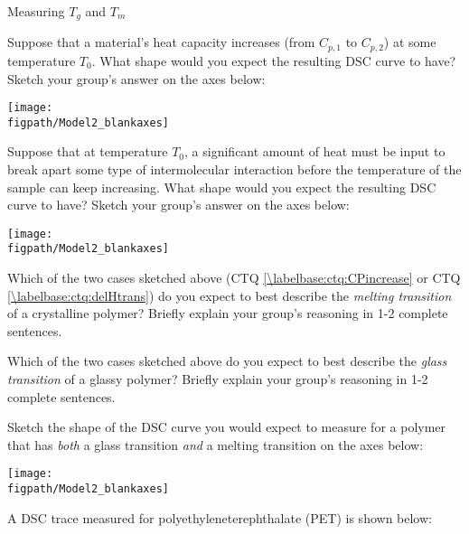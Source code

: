 \begin{activity}{Measuring $T_g$ and $T_m$}
\begin{ctqs}
			\begin{solution}[1.25in]
			\end{solution}
		
	\question Suppose that a material's heat capacity increases (from $C_{p,1}$ to $C_{p,2}$) at some temperature $T_0$.  What shape would you expect the resulting DSC curve to have?  Sketch your group's answer on the axes below: \label{\labelbase:ctq:CPincrease}
	
		\vspace{6pt}
		\centerline{\texttt{[image: \\figpath/Model2\_blankaxes]}}
		
	\question Suppose that at temperature $T_0$, a significant amount of heat must be input to break apart some type of intermolecular interaction before the temperature of the sample can keep increasing.  What shape would you expect the resulting DSC curve to have?  Sketch your group's answer on the axes below:\label{\labelbase:ctq:delHtrans}
	
		\vspace{6pt}
		\centerline{\texttt{[image: \\figpath/Model2\_blankaxes]}}
		
	\question Which of the two cases sketched above (CTQ \ref{\labelbase:ctq:CPincrease} or CTQ \ref{\labelbase:ctq:delHtrans}) do you expect to best describe the \emph{melting transition} of a crystalline polymer?  Briefly explain your group's reasoning in 1-2 complete sentences.
	
		\begin{solution}[2in]
		\end{solution}
	
	\question Which of the two cases sketched above do you expect to best describe the \emph{glass transition} of a glassy polymer?  Briefly explain your group's reasoning in 1-2 complete sentences.
	
		\begin{solution}[2in]
		\end{solution}
	
	\question Sketch the shape of the DSC curve you would expect to measure for a polymer that has \emph{both} a glass transition \emph{and} a melting transition on the axes below:
	
		\vspace{6pt}
		\centerline{\texttt{[image: \\figpath/Model2\_blankaxes]}}
	
	\clearpage
	\question A DSC trace measured for polyethyleneterephthalate (PET) is shown below:
	

\end{ctqs}
\end{activity}
